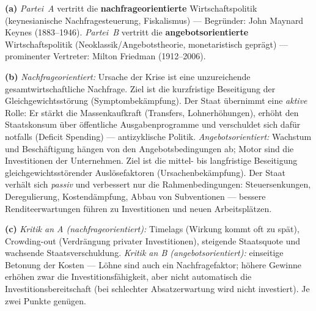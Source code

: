 \documentclass[11pt, a4paper]{article}
\begin{document}
\begin{loesung}[title={Lösung Aufgabe~8 --- Nachfrage- vs. angebotsorientierte Wirtschaftspolitik}]
\textbf{(a)} \emph{Partei~A} vertritt die \textbf{nachfrageorientierte} Wirtschaftspolitik
(keynesianische Nachfragesteuerung, Fiskalismus) --- Begründer: John Maynard Keynes
(1883--1946). \emph{Partei~B} vertritt die \textbf{angebotsorientierte} Wirtschaftspolitik
(Neoklassik/Angebotstheorie, monetaristisch geprägt) --- prominenter Vertreter: Milton
Friedman (1912--2006).

\textbf{(b)} \emph{Nachfrageorientiert:} Ursache der Krise ist eine unzureichende
gesamtwirtschaftliche Nachfrage. Ziel ist die kurzfristige Beseitigung der
Gleichgewichtsstörung (Symptombekämpfung). Der Staat übernimmt eine \emph{aktive} Rolle:
Er stärkt die Massenkaufkraft (Transfers, Lohnerhöhungen), erhöht den Staatskonsum über
öffentliche Ausgabenprogramme und verschuldet sich dafür notfalls (Deficit Spending) ---
antizyklische Politik. \emph{Angebotsorientiert:} Wachstum und Beschäftigung hängen von
den Angebotsbedingungen ab; Motor sind die Investitionen der Unternehmen. Ziel ist die
mittel- bis langfristige Beseitigung gleichgewichtsstörender Auslösefaktoren
(Ursachenbekämpfung). Der Staat verhält sich \emph{passiv} und verbessert nur die
Rahmenbedingungen: Steuersenkungen, Deregulierung, Kostendämpfung, Abbau von Subventionen
--- bessere Renditeerwartungen führen zu Investitionen und neuen Arbeitsplätzen.

\textbf{(c)} \emph{Kritik an A (nachfrageorientiert):} Timelags (Wirkung kommt oft zu
spät), Crowding-out (Verdrängung privater Investitionen), steigende Staatsquote und
wachsende Staatsverschuldung. \emph{Kritik an B (angebotsorientiert):} einseitige
Betonung der Kosten --- Löhne sind auch ein Nachfragefaktor; höhere Gewinne erhöhen zwar
die Investitionsfähigkeit, aber nicht automatisch die Investitionsbereitschaft (bei
schlechter Absatzerwartung wird nicht investiert). Je zwei Punkte genügen.
\end{loesung}
\end{document}
